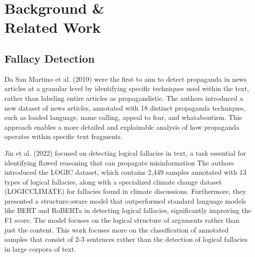\chapter{Background \& \\Related Work}

\section{Fallacy Detection}
Da San Martino et al. (2019) \cite{dasanmartinoFineGrainedAnalysisPropaganda2019} were the first to aim to detect propaganda in news articles at a granular level by identifying specific techniques used within the text, rather than labeling entire articles as propagandistic. The authors introduced a new dataset of news articles, annotated with 18 distinct propaganda techniques, such as loaded language, name calling, appeal to fear, and whataboutism. This approach enables a more detailed and explainable analysis of how propaganda operates within specific text fragments.

 Jin et al. (2022) \cite{jinLogicalFallacyDetection2022} focused on detecting logical fallacies in text, a task essential for identifying flawed reasoning that can propagate misinformation The authors introduced the LOGIC dataset, which contains 2,449 samples annotated with 13 types of logical fallacies, along with a specialized climate change dataset (LOGICCLIMATE) for fallacies found in climate discussions. Furthermore, they presented a structure-aware model that outperformed standard language models like BERT and RoBERTa in detecting logical fallacies, significantly improving the F1 score. The model focuses on the logical structure of arguments rather than just the content. 
This work focuses more on the classification of annotated samples that consist of 2-3 sentences rather than the detection of logical fallacies in large corpora of text.

